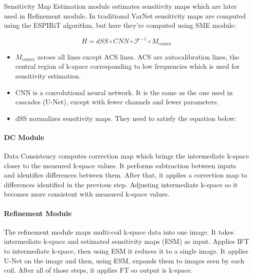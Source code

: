 \documentclass[10pt,a4paper]{article}
\begin{document}
Sensitivity Map Estimation module estimates sensitivity maps which are later used in Refinement module. In traditional VarNet sensitivity maps are computed using the ESPIRiT algorithm, but here they're computed using SME module:

$$ H = dSS \circ CNN \circ \mathcal{F}^{-1} \circ M_{\text{center}} $$


\begin{itemize}
  \item $M_{\text{center}}$ zeroes all lines except ACS lines. ACS are autocalibration lines, the central region of k-space corresponding to low frequencies which is used for sensitivity estimation.
  \item CNN is a convolutional neural network. It is the same as the one used in cascades (U-Net), except with fewer channels and fewer parameters.
  \item dSS normalizes sensitivity maps. They need to satisfy the equation below:
\end{itemize}

\paragraph{DC Module}

Data Consistency computes correction map which brings the intermediate k-space closer to the measured k-space values. It performs subtraction between inputs and identifies differences between them. After that, it applies a correction map to differences identified in the previous step. Adjusting intermediate k-space so it becomes more consistent with measured k-space values.

\paragraph{Refinement Module}

The refinement module maps multi-coil k-space data into one image. It takes intermediate k-space and estimated sensitivity maps (ESM) as input. Applies IFT to intermediate k-space, then using ESM it reduces it to a single image. It applies U-Net on the image and then, using ESM, expands them to images seen by each coil. After all of those steps, it applies FT so output is k-space.
\end{document}
